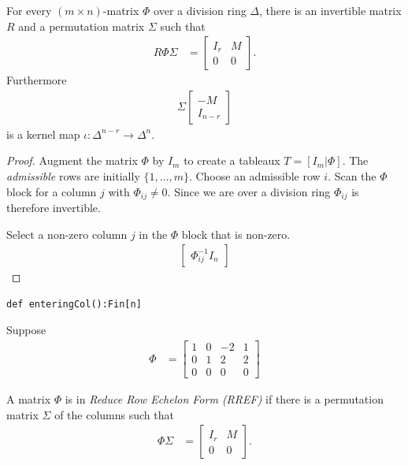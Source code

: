\documentclass[12pt,twoside,dvipsnames,letterpaper]{memoir}
\begin{document}
\begin{proposition}
    For every $(m\times n)$-matrix $\Phi$ over a division ring $\Delta$,
    there is an invertible matrix 
    $R$ and a permutation matrix $\Sigma$ such that 
    \begin{align*}
        R\Phi \Sigma & = \begin{bmatrix}
            I_r & M \\
            0 & 0 
        \end{bmatrix}.
    \end{align*}
    Furthermore 
    \begin{align*}
        \Sigma \begin{bmatrix} -M\\ I_{n-r}\end{bmatrix}
    \end{align*}
    is a kernel map $\iota:\Delta^{n-r}\to \Delta^n$.
\end{proposition}
\begin{proof}
    Augment the matrix $\Phi$ by $I_m$ to create a tableaux
    $T=[I_m | \Phi]$.  
    The \emph{admissible} rows are initially $\{1,\ldots,m\}$.
    Choose an admissible row $i$.  Scan the $\Phi$ block for 
    a column $j$ with $\Phi_{ij}\neq 0$. Since we 
    are over a division ring $\Phi_{ij}$ is therefore invertible.


    Select a non-zero column $j$ in the $\Phi$ 
    block that is non-zero.  
    \begin{align*}
        \begin{bmatrix}
            \Phi_{ij}^{-1} I_n 
        \end{bmatrix}
    \end{align*}    
\end{proof}
\begin{lstlisting}[language=Sava]
def enteringCol():Fin[n]

\end{lstlisting}

Suppose 
\begin{align*}
    \Phi & = 
    \begin{bmatrix}
        1 & 0 & -2 & 1\\
        0 & 1 & 2 & 2\\
        0 & 0 & 0 & 0
    \end{bmatrix}
\end{align*}


\begin{definition}
    A matrix $\Phi$ is in \emph{Reduce Row Echelon Form (RREF)}
    if there is a permutation matrix $\Sigma$ of the columns such 
    that 
    \begin{align*}
        \Phi\Sigma & = \begin{bmatrix}
            I_r & M \\
            0 & 0 
        \end{bmatrix}.
    \end{align*}
\end{definition}
\end{document}
